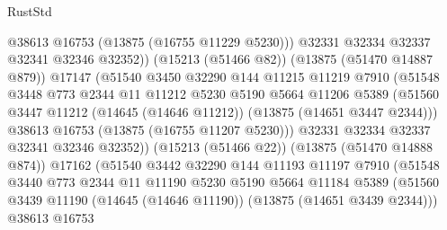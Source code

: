 \begin{lexlean}{RustStd}
\begin{coremodule}
                              @38613
                              @16753
                              (@13875 (@16755 @11229 @5230)))
                            @32331
                            @32334
                            @32337
                            @32341
                            @32346
                            @32352))
                        (@15213 (@51466 @82))
                        (@13875 (@51470 @14887 @879))
                        @17147
                        (@51540
                          @3450
                          @32290
                          @144
                          @11215
                          @11219
                          @7910
                          (@51548
                            @3448
                            @773
                            @2344
                            @11
                            @11212
                            @5230
                            @5190
                            @5664
                            @11206
                            @5389
                            (@51560
                              @3447
                              @11212
                              (@14645 (@14646 @11212))
                              (@13875 (@14651 @3447 @2344)))
                            @38613
                            @16753
                            (@13875 (@16755 @11207 @5230)))
                          @32331
                          @32334
                          @32337
                          @32341
                          @32346
                          @32352))
                      (@15213 (@51466 @22))
                      (@13875 (@51470 @14888 @874))
                      @17162
                      (@51540
                        @3442
                        @32290
                        @144
                        @11193
                        @11197
                        @7910
                        (@51548
                          @3440
                          @773
                          @2344
                          @11
                          @11190
                          @5230
                          @5190
                          @5664
                          @11184
                          @5389
                          (@51560
                            @3439
                            @11190
                            (@14645 (@14646 @11190))
                            (@13875 (@14651 @3439 @2344)))
                          @38613
                          @16753

\end{coremodule}
\end{lexlean}
